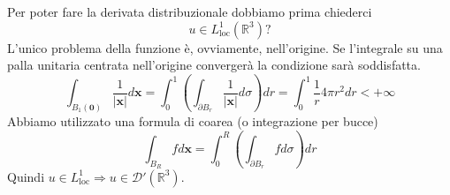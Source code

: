 \documentclass[10pt,a4paper,twoside,openright]{book}
\begin{document}
Per poter fare la derivata distribuzionale dobbiamo prima chiederci
\begin{equation*}
	u\in L^{1}_{\text{loc}}\left(\mathbb{R}^{3}\right) ?
\end{equation*}
L'unico problema della funzione è, ovviamente, nell'origine. Se l'integrale su una palla unitaria centrata nell'origine convergerà la condizione sarà soddisfatta.
\begin{equation*}
	\int _{B_{1}(\mathbf{0})}\frac{1}{| \mathbf{x}| } d\mathbf{x} =\int ^{1}_{0}\left(\int _{\partial B_{r}}\frac{1}{| \mathbf{x}| } d\sigma \right) dr=\int ^{1}_{0}\frac{1}{r} 4\pi r^{2} dr< +\infty 
\end{equation*}
Abbiamo utilizzato una formula di coarea (o integrazione per bucce) 
\begin{equation*}
	\int _{B_{R}} fd\mathbf{x} =\int ^{R}_{0}\left(\int _{\partial B_{r}} fd\sigma \right) dr
\end{equation*}
Quindi $\displaystyle u\in L^{1}_{\text{loc}} \Rightarrow u\in \mathcal{D} '\left(\mathbb{R}^{3}\right)$.
\end{document}

